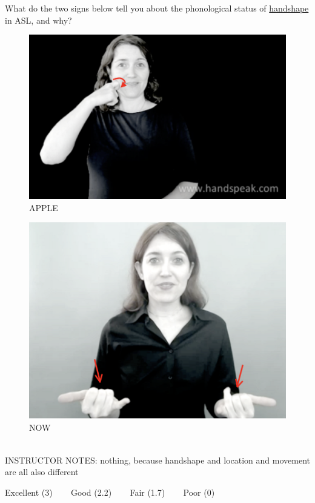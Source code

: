 \documentclass[12pt]{article}
\begin{document}
What do the two signs below tell you about the phonological status of \underline{handshape} in ASL, and why?\\

\begin{figure}[H]
\includegraphics{../images/asl_apple.png}
\caption{APPLE}
\end{figure}
\begin{figure}[H]
\includegraphics{../images/asl_now.png}
\caption{NOW}
\end{figure}

~\\
INSTRUCTOR NOTES: nothing, because handshape and location and movement are all also different


\vfill
Excellent (3) ~~~ Good (2.2) ~~~ Fair (1.7) ~~~ Poor (0)
\newpage
\end{document}
